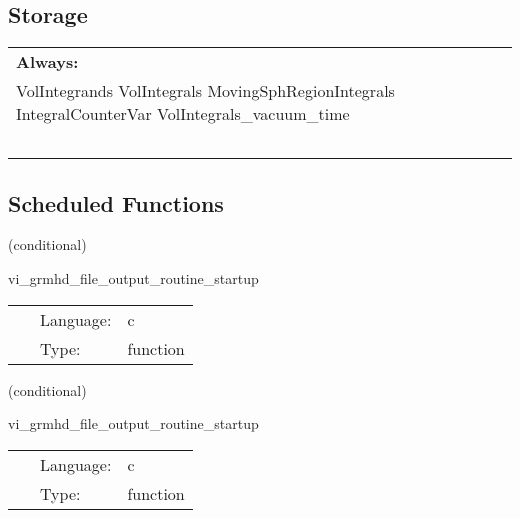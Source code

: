 \subsection*{Storage}

\hspace{5mm}

 \begin{tabular*}{160mm}{ll} 

{\bf Always:}&  ~ \\ 
 VolIntegrands VolIntegrals MovingSphRegionIntegrals IntegralCounterVar VolIntegrals\_vacuum\_time & ~\\ 
~ & ~\\ 
\end{tabular*} 


\subsection*{Scheduled Functions}
\vspace{5mm}

   (conditional) 

\hspace{5mm} vi\_grmhd\_file\_output\_routine\_startup 

\hspace{5mm}{\it create directory for vi grmhd file output. } 


\hspace{5mm}

 \begin{tabular*}{160mm}{cll} 
~ & Language:  & c \\ 
~ & Type:  & function \\ 
\end{tabular*} 


\vspace{5mm}

   (conditional) 

\hspace{5mm} vi\_grmhd\_file\_output\_routine\_startup 

\hspace{5mm}{\it create directory for vi grmhd file output. } 


\hspace{5mm}

 \begin{tabular*}{160mm}{cll} 
~ & Language:  & c \\ 
~ & Type:  & function \\ 
\end{tabular*} 


